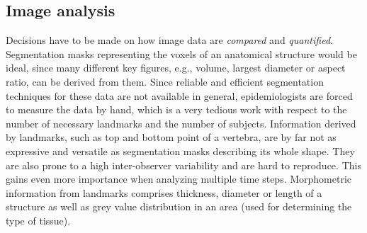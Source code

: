 \documentclass[journal]{style/vgtc} 			          %
\begin{document}
\subsection{Image analysis} \label{ImageAnalysis} Decisions have to be made on how image data are \emph{compared} and \emph{quantified}.
%
Segmentation masks representing the voxels of an anatomical structure would be ideal, since many different key figures, e.g., volume, largest diameter or aspect ratio, can be derived from them.
%
Since reliable and efficient segmentation techniques for these data are not available in general, epidemiologists are forced to measure the data by hand, which is a very tedious work with respect to the number of necessary landmarks and the number of subjects.
%
Information derived by landmarks, such as top and bottom point of a vertebra, are by far not as expressive and versatile as segmentation masks describing its whole shape.
%
They are also prone to a high inter-observer variability and are hard to reproduce.
%
This gains even more importance when analyzing multiple time steps.
%
Morphometric information from landmarks comprises thickness, diameter or length of a structure as well as grey value distribution in an area (used for determining the type of tissue).

\end{document}
